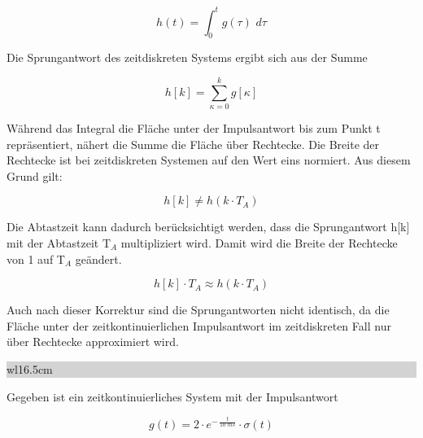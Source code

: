\begin{equation}\label{eq:sixfourtyone}
h\left(t\right)=\int _{0}^{t}g\left(\tau \right) \, \, d\tau 
\end{equation}

\noindent Die Sprungantwort des zeitdiskreten Systems ergibt sich aus der Summe

\begin{equation}\label{eq:sixfourtytwo}
h\left[k\right]=\sum _{\kappa =0}^{k}g\left[\kappa \right]
\end{equation}

\noindent W\"{a}hrend das Integral die Fl\"{a}che unter der Impulsantwort bis zum Punkt t repr\"{a}sentiert, n\"{a}hert die Summe die Fl\"{a}che \"{u}ber Rechtecke. Die Breite der Rechtecke ist bei zeitdiskreten Systemen auf den Wert eins normiert. Aus diesem Grund gilt: 

\begin{equation}\label{eq:sixfourtythree}
h\left[k\right]\ne h\left(k\cdot T_{A} \right)
\end{equation}

\noindent Die Abtastzeit kann dadurch ber\"{u}cksichtigt werden, dass die Sprungantwort h[k] mit der Abtastzeit T${}_{A}$ multipliziert wird. Damit wird die Breite der Rechtecke von 1 auf T${}_{A}$ ge\"{a}ndert. 

\begin{equation}\label{eq:sixfourtyfour}
h\left[k\right]\cdot T_{A} \approx h\left(k\cdot T_{A} \right)
\end{equation}

\noindent Auch nach dieser Korrektur sind die Sprungantworten nicht identisch, da die Fl\"{a}che unter der zeitkontinuierlichen Impulsantwort im zeitdiskreten Fall nur \"{u}ber Rechtecke approximiert wird.

\clearpage

\noindent
\colorbox{lightgray}{%
%
\renewcommand\arraystretch{0.6}%
\begin{tabular}{ wl{16.5cm} }
{\selectfont{Beispiel: Vergleich von Sprungantworten}}
\end{tabular}%
}\medskip

\noindent Gegeben ist ein zeitkontinuierliches System mit der Impulsantwort

\begin{equation}\label{eq:sixfourtyfive}
g\left(t\right)=2\cdot e^{-\, \frac{t}{10\, \, ms} } \cdot \sigma \left(t\right)
\end{equation}

